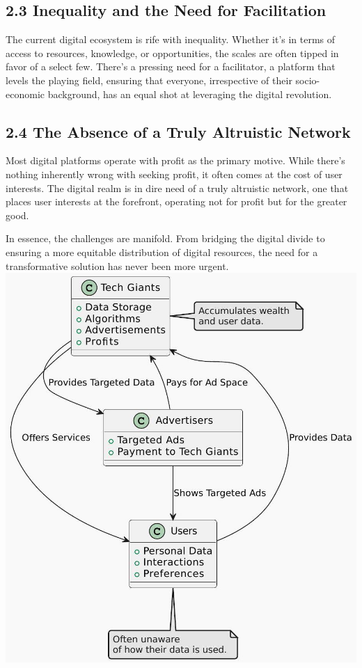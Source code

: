 \documentclass[10pt]{article}
\begin{document}
\subsection*{2.3 Inequality and the Need for Facilitation}
The current digital ecosystem is rife with inequality. Whether it's in terms of access to resources, knowledge, or opportunities, the scales are often tipped in favor of a select few. There's a pressing need for a facilitator, a platform that levels the playing field, ensuring that everyone, irrespective of their socio-economic background, has an equal shot at leveraging the digital revolution.

\subsection*{2.4 The Absence of a Truly Altruistic Network}
Most digital platforms operate with profit as the primary motive. While there's nothing inherently wrong with seeking profit, it often comes at the cost of user interests. The digital realm is in dire need of a truly altruistic network, one that places user interests at the forefront, operating not for profit but for the greater good.

In essence, the challenges are manifold. From bridging the digital divide to ensuring a more equitable distribution of digital resources, the need for a transformative solution has never been more urgent.\\
\includegraphics[max width=\textwidth, center]{2025_03_06_545dea0014012947d15fg-02}
\end{document}
